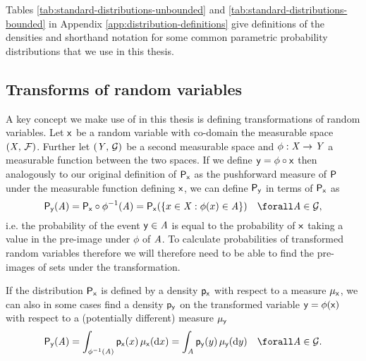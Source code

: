 Tables \ref{tab:standard-distributions-unbounded} and \ref{tab:standard-distributions-bounded} in Appendix \ref{app:distribution-definitions} give definitions of the densities and shorthand notation for some common parametric probability distributions that we use in this thesis.

\subsection{Transforms of random variables}\label{subsec:change-of-variables}

A key concept we make use of in this thesis is defining transformations of random variables. Let $\mathsf{x}$ be a random variable with co-domain the measurable space $(\mathit{X},\,\mathcal{F})$. Further let $(\mathit{Y},\,\mathcal{G})$ be a second measurable space and $\phi : \mathit{X} \to \mathit{Y}$ a measurable function between the two spaces. If we define $\mathsf{y} = \phi \circ \mathsf{x}$ then analogously to our original definition of $\mathsf{P}_{\mathsf{x}}$ as the pushforward measure of $\mathsf{P}$ under the measurable function defining $\mathsf{x}$, we can define $\mathsf{P}_{\mathsf{y}}$ in terms of $\mathsf{P}_{\mathsf{x}}$ as
\begin{equation}\label{eq:change-of-variables-probability}
  \prob{\rvar{y}}(\set{A}) = 
  \prob{\rvar{x}} \circ \phi^{-1}(\set{A}) =
  \prob{\rvar{x}}\lpa \lbrace x \in \set{X} : \phi(x) \in \set{A} \rbrace \rpa
  \quad \forall \set{A} \in \sset{G},
\end{equation}
i.e. the probability of the event $\mathsf{y} \in \mathit{A}$ is equal to the probability of $\mathsf{x}$ taking a value in the pre-image under $\phi$ of $\mathit{A}$. To calculate probabilities of transformed random variables therefore we will therefore need to be able to find the pre-images of sets under the transformation.

If the distribution $\mathsf{P}_{\mathsf{x}}$ is defined by a density $\mathsf{p}_{\mathsf{x}}$ with respect to a measure $\mu_{\mathsf{x}}$, we can also in some cases find a density $\mathsf{p}_{\mathsf{y}}$ on the transformed variable $\mathsf{y} = \phi(\mathsf{x})$ with respect to a (potentially different) measure $\mu_{\mathsf{y}}$
\begin{equation}\label{eq:change-of-variables-general}
  \prob{\rvar{y}}(\set{A}) =
  \int_{\phi^{-1}(\set{A})} \pden{\rvar{x}}(x) \,\mu_{\rvar{x}}(\dr x) = 
  \int_{\set{A}} \pden{\rvar{y}}(y) \,\mu_{\rvar{y}}(\dr y)
  \quad \forall \set{A} \in \sset{G}.
\end{equation}

